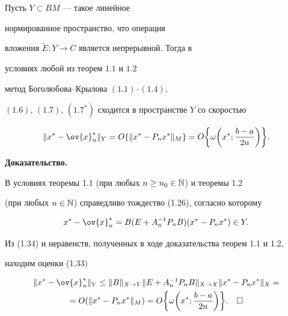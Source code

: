 \begin{thms}


Пусть $Y\subset BM$ --- такое линейное 


нормированное пространство, что операция


вложения $\widetilde{E}:Y\rightarrow C$ является непрерывной. Тогда в


условиях любой из теорем $1.1$ и $1.2$


метод Боголюбова--Крылова $(1.1)$--$(1.4)$,


$(1.6)$, $(1.7)$, $(1.7^*)$ сходится в пространстве $Y$ со скоростью


\begin{equation}


\|x^*-\ov{x}_n^*\|_Y =O\{ \|x^*-P_nx^*\|_M\} =


O\bigg\{ \omega\bigg(x^*;\frac{b-a}{2n}\bigg) \bigg\} .


\end{equation}


\end{thms}





{\bf Доказательство.}


В условиях теоремы 1.1 (при любых $n\geq n_0\in \Bbb N$) и теоремы 1.2


(при любых $n\in \Bbb N$) справедливо тождество (1.26), согласно которому


\begin{equation}


x^*-\ov{x}_n^*=B(E+A_n^{-1}P_nB)(x^*-P_nx^*)\in Y .


\end{equation}


Из (1.34) и неравенств, полученных в ходе доказательства теорем 1.1 и 1.2,


находим оценки (1.33)


\begin{multline*}


\|x^*-\ov{x}_n^*\|_Y\leq \|B\|_{X\rightarrow Y} \|E+A_n^{-1}


P_nB\|_{X\rightarrow X} \|x^*-P_nx^*\|_X=\\


%


=O(\|x^*-P_nx^*\|_M)=O\bigg\{\omega\bigg(x^*;\frac{b-a}{2n}\bigg)


\bigg\} .\quad\square


\end{multline*}





